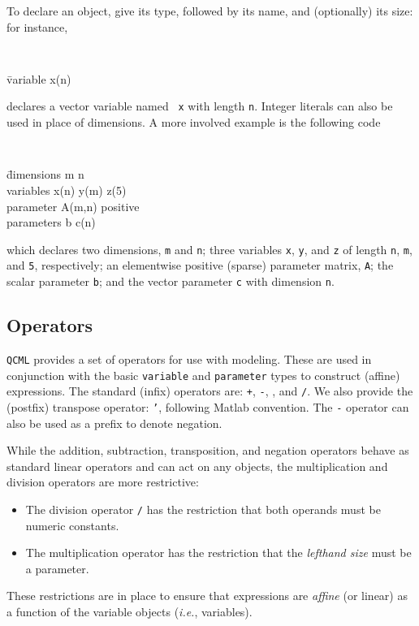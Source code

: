 \documentclass[11pt]{article}
\def\qcml{\texttt{QCML}\xspace}
\newcommand{\ie}{{\it i.e.}}
\begin{document}
To declare an object, give its type, followed by its name, and (optionally) 
its size: for instance,
{\tt
\begin{tabbing}
  \qquad \= variable x(n)
\end{tabbing}}
\noindent declares a vector variable named {\tt
x} with length {\tt n}. 
Integer literals can also be used in place of dimensions. A more involved
example is the following code
{\tt
\begin{tabbing}
  \qquad \= dimensions m n \\
  \> variables x(n) y(m) z(5)\\
  \> parameter A(m,n) positive \\
  \> parameters b c(n)
\end{tabbing}}
\noindent which declares two dimensions, {\tt m} and {\tt n}; three variables
{\tt x}, {\tt y}, and {\tt z} of length {\tt n}, {\tt m}, and {\tt 5},
respectively; an elementwise positive (sparse) parameter matrix, {\tt A}; the
scalar parameter {\tt b}; and the vector parameter {\tt c} with dimension
{\tt n}.

\subsection{Operators}
\qcml provides a set of operators for use with modeling. These are used in
conjunction with the basic {\tt variable} and {\tt parameter} types to
construct (affine) expressions. The standard (infix) operators are: {\tt +},
{\tt -}, {\tt *}, and {\tt /}. We also provide the (postfix) transpose 
operator: {\tt '}, following Matlab convention. The {\tt -}
operator can also be used as a prefix to denote negation.

While the addition, subtraction, transposition, and negation operators 
behave as standard linear operators and can act on any objects, the 
multiplication and division operators are more restrictive:
\begin{itemize}
\item The division operator {\tt /} has the restriction that both operands 
must be numeric constants. 
\item The multiplication operator {\tt *} has the restriction that the
\emph{lefthand size} must be a parameter.
\end{itemize}
These restrictions are in place to ensure that expressions are \emph{affine}
(or linear) as a function of the variable objects (\ie, variables).
\end{document}
